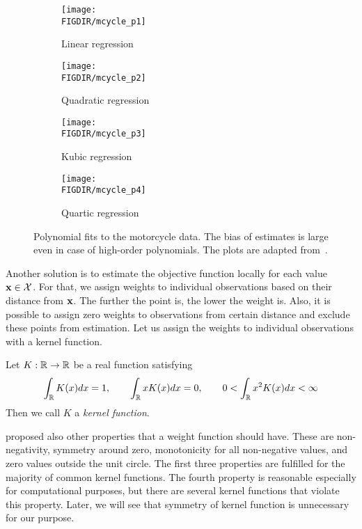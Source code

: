 \begin{figure}[t]
	\centering
	
	\begin{subfigure}[b]{0.45\textwidth}
    \centering
		\texttt{[image: \\FIGDIR/mcycle\_p1]}
    \caption{Linear regression}
  \end{subfigure}
	\hfill
	\begin{subfigure}[b]{0.45\textwidth}
    \centering
		\texttt{[image: \\FIGDIR/mcycle\_p2]}
    \caption{Quadratic regression}
  \end{subfigure}

	\begin{subfigure}[b]{0.45\textwidth}
    \centering
		\texttt{[image: \\FIGDIR/mcycle\_p3]}
    \caption{Kubic regression}
  \end{subfigure}
	\hfill
	\begin{subfigure}[b]{0.45\textwidth}
    \centering
		\texttt{[image: \\FIGDIR/mcycle\_p4]}
    \caption{Quartic regression}
  \end{subfigure}

	\caption{Polynomial fits to the motorcycle data. The bias of estimates is large even in case of high-order polynomials. The plots are adapted from~\cite{Fan03}.}
	\label{fig:mcycle}
\end{figure}

Another solution is to estimate the objective function locally for each value $\mathbf{x} \in \mathcal{X}$. For that, we assign weights to individual observations based on their distance from $\mathbf{x}$. The further the point is, the lower the weight is. Also, it is possible to assign zero weights to observations from certain distance and exclude these points from estimation. Let us assign the weights to individual observations with a kernel function.

\begin{definition}
	Let $K: \mathbb{R} \to \mathbb{R}$ be a real function satisfying
	\[
		\int_{\mathbb{R}} K(x) dx = 1, \qquad
		\int_{\mathbb{R}} x K(x) dx = 0, \qquad
		0 < \int_{\mathbb{R}} x^2 K(x) dx < \infty
	\]
	Then we call $K$ a \emph{kernel function}.
\end{definition}

\cite{Cleveland79} proposed also other properties that a weight function should have. These are non-negativity, symmetry around zero, monotonicity for all non-negative values, and zero values outside the unit circle. The first three properties are fulfilled for the majority of common kernel functions. The fourth property is reasonable especially for computational purposes, but there are several kernel functions that violate this property. Later, we will see that symmetry of kernel function is unnecessary for our purpose.

